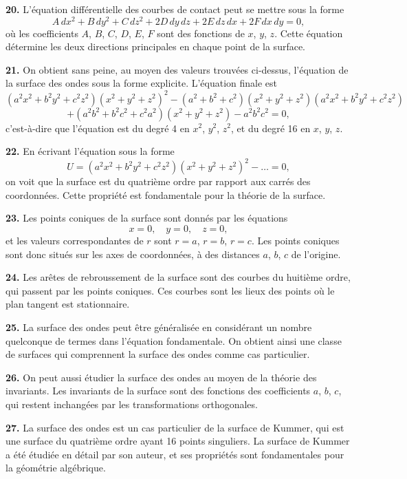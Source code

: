 \documentclass[12pt,a4paper]{article}
\begin{document}
\textbf{20.} L'\'equation diff\'erentielle des courbes de contact peut se mettre sous
la forme
\[
A\,dx^2 + B\,dy^2 + C\,dz^2 + 2D\,dy\,dz + 2E\,dz\,dx + 2F\,dx\,dy = 0,
\]
o\`u les coefficients $A$, $B$, $C$, $D$, $E$, $F$ sont des fonctions de $x$, $y$, $z$. Cette \'equation
d\'etermine les deux directions principales en chaque point de la surface.

\newpage
\textbf{21.} On obtient sans peine, au moyen des valeurs trouv\'ees ci-dessus,
l'\'equation de la surface des ondes sous la forme explicite. L'\'equation finale est
\[
(a^2x^2 + b^2y^2 + c^2z^2)(x^2 + y^2 + z^2)^2 - (a^2 + b^2 + c^2)(x^2 + y^2 + z^2)(a^2x^2 + b^2y^2 + c^2z^2)
\]
\[
+ (a^2b^2 + b^2c^2 + c^2a^2)(x^2 + y^2 + z^2) - a^2b^2c^2 = 0,
\]
c'est-\`a-dire que l'\'equation est du degr\'e 4 en $x^2$, $y^2$, $z^2$, et du degr\'e 16 en $x$, $y$, $z$.

\textbf{22.} En \'ecrivant l'\'equation sous la forme
\[
U = (a^2x^2 + b^2y^2 + c^2z^2)(x^2 + y^2 + z^2)^2 - \ldots = 0,
\]
on voit que la surface est du quatri\`eme ordre par rapport aux carr\'es des
coordonn\'ees. Cette propri\'et\'e est fondamentale pour la th\'eorie de la surface.

\textbf{23.} Les points coniques de la surface sont donn\'es par les \'equations
\[
x = 0, \quad y = 0, \quad z = 0,
\]
et les valeurs correspondantes de $r$ sont $r = a$, $r = b$, $r = c$. Les points coniques
sont donc situ\'es sur les axes de coordonn\'ees, \`a des distances $a$, $b$, $c$ de l'origine.

\textbf{24.} Les ar\^etes de rebroussement de la surface sont des courbes du huiti\`eme
ordre, qui passent par les points coniques. Ces courbes sont les lieux des points
o\`u le plan tangent est stationnaire.

\textbf{25.} La surface des ondes peut \^etre g\'en\'eralis\'ee en consid\'erant un nombre
quelconque de termes dans l'\'equation fondamentale. On obtient ainsi une classe
de surfaces qui comprennent la surface des ondes comme cas particulier.

\textbf{26.} On peut aussi \'etudier la surface des ondes au moyen de la th\'eorie
des invariants. Les invariants de la surface sont des fonctions des coefficients
$a$, $b$, $c$, qui restent inchang\'ees par les transformations orthogonales.

\textbf{27.} La surface des ondes est un cas particulier de la surface de Kummer,
qui est une surface du quatri\`eme ordre ayant 16 points singuliers. La surface de
Kummer a \'et\'e \'etudi\'ee en d\'etail par son auteur, et ses propri\'et\'es sont fondamentales
pour la g\'eom\'etrie alg\'ebrique.
\end{document}
